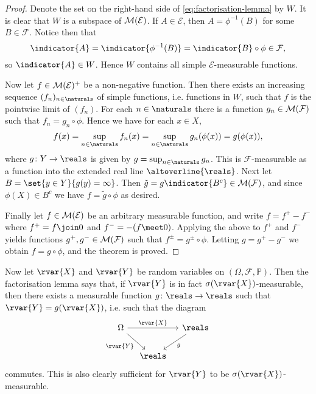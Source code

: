 \documentclass[article, a4paper, 11pt, oneside]{memoir}
\numberwithin{equation}{chapter}
\newcommand{\preim}{^{-1}}
\newcommand{\calE}{\mathcal{E}}
\newcommand{\calF}{\mathcal{F}}
\renewcommand{\P}{\mathbb{P}}
\begin{document}
\begin{proof}
    Denote the set on the right-hand side of \eqref{eq:factorisation-lemma} by $W$. It is clear that $W$ is a subspace of $\meas{\calE}$. If $A \in \calE$, then $A = \phi\preim(B)$ for some $B \in \calF$. Notice then that
    \begin{equation*}
        \indicator{A}
            = \indicator{\phi\preim(B)}
            = \indicator{B} \circ \phi
            \in \calF,
    \end{equation*}
    so $\indicator{A} \in W$. Hence $W$ contains all simple $\calE$-measurable functions.
    
    Now let $f \in \meas{\calE}^+$ be a non-negative function. Then there exists an increasing sequence $(f_n)_{n\in\naturals}$ of simple functions, i.e. functions in $W$, such that $f$ is the pointwise limit of $(f_n)$. For each $n\in\naturals$ there is a function $g_n \in \meas{\calF}$ such that $f_n = g_n \circ \phi$. Hence we have for each $x \in X$,
    \begin{equation*}
        f(x)
            = \sup_{n\in\naturals} f_n(x)
            = \sup_{n\in\naturals} g_n(\phi(x))
            = g(\phi(x)),
    \end{equation*}
    where $g \colon Y \to \reals$ is given by $g = \sup_{n\in\naturals}g_n$. This is $\calF$-measurable as a function into the extended real line $\altoverline{\reals}$. Next let $B = \set{y \in Y}{g(y) = \infty}$. Then $\tilde{g} = g \indicator{B^c} \in \meas{\calF}$, and since $\phi(X) \in B^c$ we have $f = \tilde{g} \circ \phi$ as desired.

    Finally let $f \in \meas{\calE}$ be an arbitrary measurable function, and write $f = f^+ - f^-$ where $f^+ = f \join 0$ and $f^- = -(f \meet 0)$. Applying the above to $f^+$ and $f^-$ yields functions $g^+, g^- \in \meas{\calF}$ such that $f^\pm = g^\pm \circ \phi$. Letting $g = g^+ - g^-$ we obtain $f = g \circ \phi$, and the theorem is proved.
\end{proof}
%
Now let $\rvar{X}$ and $\rvar{Y}$ be random variables on $(\Omega,\calF,\P)$. Then the factorisation lemma says that, if $\rvar{Y}$ is in fact $\sigma(\rvar{X})$-measurable, then there exists a measurable function $g \colon \reals \to \reals$ such that $\rvar{Y} = g(\rvar{X})$, i.e. such that the diagram
%
\begin{equation*}
    \begin{tikzcd}[column sep=1em]
        \Omega
            \ar[rr, "\rvar{X}"]
            \ar[dr, "\rvar{Y}", swap]
        && \reals
            \ar[dl, "g"] \\
        & \reals
    \end{tikzcd}
\end{equation*}
%
commutes. This is also clearly sufficient for $\rvar{Y}$ to be $\sigma(\rvar{X})$-measurable.
\end{document}
